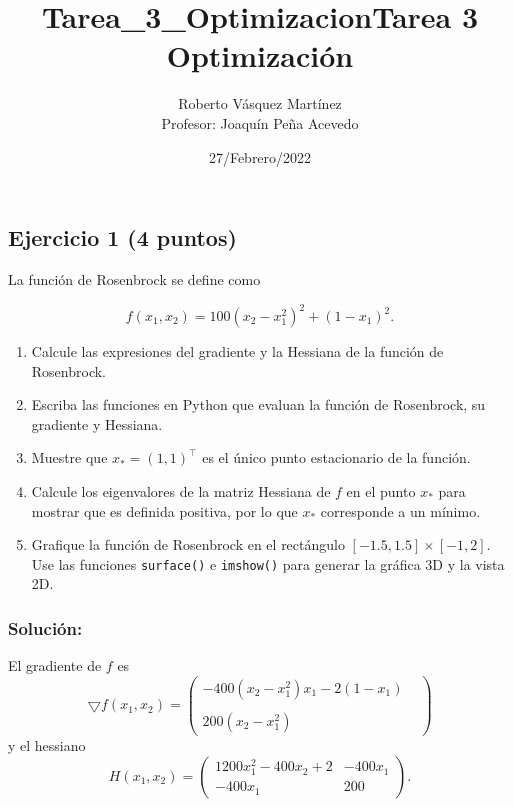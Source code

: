 \documentclass[11pt]{article}
\title{Tarea\_3\_Optimizacion}
\providecommand{\tightlist}{%
      \setlength{\itemsep}{0pt}\setlength{\parskip}{0pt}}
\begin{document}
    \title{Tarea 3 Optimización}
    \author{Roberto Vásquez Martínez \\ Profesor: Joaquín Peña Acevedo}
    \date{27/Febrero/2022}
    \maketitle

    
    \hypertarget{ejercicio-1-4-puntos}{%
\subsection{Ejercicio 1 (4 puntos)}\label{ejercicio-1-4-puntos}}

La función de Rosenbrock se define como

\[ f(x_1, x_2) = 100\left(x_2 − x_1^2 \right)^2 + (1 − x_1)^2. \]

\begin{enumerate}
\def\labelenumi{\arabic{enumi}.}
\tightlist
\item
  Calcule las expresiones del gradiente y la Hessiana de la función de
  Rosenbrock.
\item
  Escriba las funciones en Python que evaluan la función de Rosenbrock,
  su gradiente y Hessiana.
\item
  Muestre que \(x_* = (1,1)^{\top}\) es el único punto estacionario de
  la función.
\item
  Calcule los eigenvalores de la matriz Hessiana de \(f\) en el punto
  \(x_*\) para mostrar que es definida positiva, por lo que \(x_*\)
  corresponde a un mínimo.
\item
  Grafique la función de Rosenbrock en el rectángulo
  \([-1.5, 1.5] \times [-1, 2]\). Use las funciones \texttt{surface()} e
  \texttt{imshow()} para generar la gráfica 3D y la vista 2D.
\end{enumerate}

\hypertarget{soluciuxf3n}{%
\subsubsection{Solución:}\label{soluciuxf3n}}

    El gradiente de \(f\) es
\[\bigtriangledown f(x_1,x_2)=\begin{pmatrix}-400(x_2-x_1^2)x_1-2(1-x_1)&\\ &\\200(x_2-x_1^2)&\end{pmatrix}\]
y el hessiano
\[ H(x_1,x_2)=\begin{pmatrix}1200x_1^2-400x_2+2 & -400x_1\\ -400x_1 & 200\end{pmatrix}.\]
\end{document}
